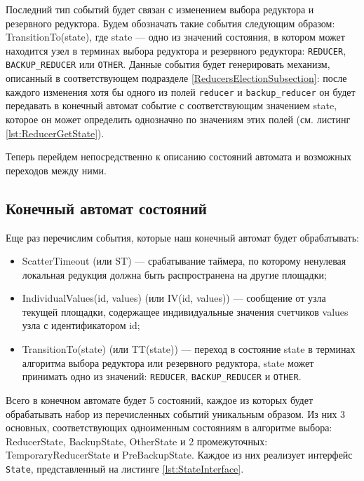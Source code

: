 \documentclass{article}
\theoremstyle{plain}
\theoremstyle{plain}
\theoremstyle{plain}
\theoremstyle{plain}
\theoremstyle{definition}
\theoremstyle{remark}
\theoremstyle{plain}
\begin{document}
Последний тип событий будет связан с изменением выбора редуктора и резервного редуктора. Будем обозначать такие события следующим образом: TransitionTo(state), где state --- одно из значений состояния, в котором может находится узел в терминах выбора редуктора и резервного редуктора: \texttt{REDUCER}, \texttt{BACKUP\_REDUCER} или \texttt{OTHER}. Данные события будет генерировать механизм, описанный в соответствующем подразделе \ref{ReducersElectionSubsection}: после каждого изменения хотя бы одного из полей \texttt{reducer} и \texttt{backup\_reducer} он будет передавать в конечный автомат событие с соответствующим значением state, которое он может определить однозначно по значениям этих полей (см. листинг \ref{lst:ReducerGetState}).

Теперь перейдем непосредственно к описанию состояний автомата и возможных переходов между ними.

\subsection{Конечный автомат состояний}
\label{StateMachineSubsection}

Еще раз перечислим события, которые наш конечный автомат будет обрабатывать:

\begin{itemize}
    \item ScatterTimeout (или ST) --- срабатывание таймера, по которому ненулевая локальная редукция должна быть распространена на другие площадки;
    
    \item IndividualValues(id, values) (или IV(id, values)) --- сообщение от узла текущей площадки, содержащее индивидуальные значения счетчиков values узла с идентификатором id;
    
    \item TransitionTo(state) (или TT(state)) --- переход в состояние state в терминах алгоритма выбора редуктора или резервного редуктора, state может принимать одно из значений: \texttt{REDUCER}, \texttt{BACKUP\_REDUCER} и \texttt{OTHER}.
\end{itemize}

Всего в конечном автомате будет 5 состояний, каждое из которых будет обрабатывать набор из перечисленных событий уникальным образом. Из них 3 основных, соответствующих одноименным состояниям в алгоритме выбора: ReducerState, BackupState, OtherState и 2 промежуточных: TemporaryReducerState и PreBackupState. Каждое из них реализует интерфейс \texttt{State}, представленный на листинге \ref{lst:StateInterface}.
\end{document}
